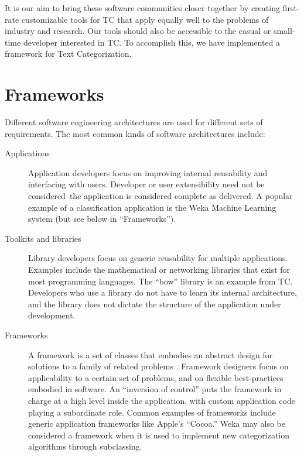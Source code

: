 \documentclass[a4paper,twocolumn]{article}
\begin{document}
It is our aim to bring these software communities closer together by creating first-rate customizable tools for TC that apply equally well to the problems of industry and research.  Our tools should also be accessible to the casual or small-time developer interested in TC.  To accomplish this, we have implemented a framework for Text Categorization.

\section{Frameworks}

Different software engineering architectures are used for different sets of requirements.  The most common kinds of software architectures include:


\begin{description}
\item[Applications] Application developers focus on improving internal reusability and interfacing with users.  Developer or user extensibility need not be considered--the application is considered complete as delivered.  A popular example of a classification application is the Weka Machine Learning system (but see below in ``Frameworks'').   \cite{weka:99}

\item[Toolkits and libraries] Library developers focus on generic reusability for multiple applications.  Examples include the mathematical or networking libraries that exist for most programming languages.  The ``bow'' library \cite{bow:96} is an example from TC.  Developers who use a library do not have to learn its internal architecture, and the library does not dictate the structure of the application under development.  \cite{fayad:99}

\item[Frameworks] A framework is a set of classes that embodies an abstract design for solutions to a family of related problems \cite[Ch. 2]{fayad:99}.  Framework designers focus on applicability to a certain set of problems, and on flexible best-practices embodied in software.  An ``inversion of control'' puts the framework in charge at a high level inside the application, with custom application code playing a subordinate role.  Common examples of frameworks include generic application frameworks like Apple's ``Cocoa.''  Weka may also be considered a framework when it is used to implement new categorization algorithms through subclassing.
\end{description}
\end{document}
